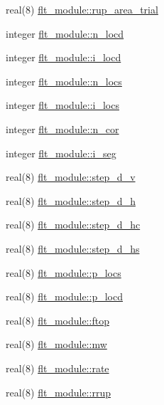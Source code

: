 \begin{DoxyCompactItemize}
\item 
real(8) \hyperlink{namespaceflt__module_af824d404f5d8ef8f21222c648b493389}{flt\+\_\+module\+::rup\+\_\+area\+\_\+trial}
\item 
integer \hyperlink{namespaceflt__module_a82fbb8ec3230fb344b2e8970e95398e3}{flt\+\_\+module\+::n\+\_\+locd}
\item 
integer \hyperlink{namespaceflt__module_ab114b19843b4c7f6c795898a67157717}{flt\+\_\+module\+::i\+\_\+locd}
\item 
integer \hyperlink{namespaceflt__module_a544a94f997804736b60b9989c7489732}{flt\+\_\+module\+::n\+\_\+locs}
\item 
integer \hyperlink{namespaceflt__module_ab04ec1f028778d49315cb1d0f6e80941}{flt\+\_\+module\+::i\+\_\+locs}
\item 
integer \hyperlink{namespaceflt__module_ab23ea8eb58ad8e18929cf668eb01f663}{flt\+\_\+module\+::n\+\_\+cor}
\item 
integer \hyperlink{namespaceflt__module_a74639d2c8f137bceff8db7f162301d8c}{flt\+\_\+module\+::i\+\_\+seg}
\item 
real(8) \hyperlink{namespaceflt__module_a3a9896b28d0823ab1f9c8bda7380c0d9}{flt\+\_\+module\+::step\+\_\+d\+\_\+v}
\item 
real(8) \hyperlink{namespaceflt__module_a2bbb6ee47643b88f63a980bf4f075ad5}{flt\+\_\+module\+::step\+\_\+d\+\_\+h}
\item 
real(8) \hyperlink{namespaceflt__module_afaa001d959f566926be3b2e7383fa244}{flt\+\_\+module\+::step\+\_\+d\+\_\+hc}
\item 
real(8) \hyperlink{namespaceflt__module_a5e5aaec050d5c1fa09b359dc2b162532}{flt\+\_\+module\+::step\+\_\+d\+\_\+hs}
\item 
real(8) \hyperlink{namespaceflt__module_ac1c817f0b45b42ee735df0300075b47e}{flt\+\_\+module\+::p\+\_\+locs}
\item 
real(8) \hyperlink{namespaceflt__module_a9a55926b369374d66caf682a539d8acf}{flt\+\_\+module\+::p\+\_\+locd}
\item 
real(8) \hyperlink{namespaceflt__module_a9e6d611f8124986d8547149562e07e40}{flt\+\_\+module\+::ftop}
\item 
real(8) \hyperlink{namespaceflt__module_aa0b3754bd3b678669c3b99f861359208}{flt\+\_\+module\+::mw}
\item 
real(8) \hyperlink{namespaceflt__module_ac0a06739ec2f31f13ad0b2213797e9c7}{flt\+\_\+module\+::rate}
\item 
real(8) \hyperlink{namespaceflt__module_aacc666d4125c94c8ff0b54e1a6fac18b}{flt\+\_\+module\+::rrup}

\end{DoxyCompactItemize}
